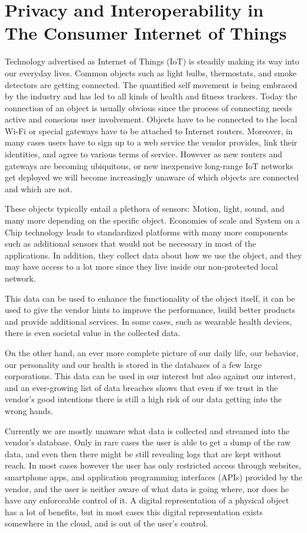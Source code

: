 \chapter{Privacy and Interoperability in The Consumer Internet of Things}


Technology advertised as Internet of Things (IoT) is steadily making its way into our everyday lives. Common objects such as light bulbs, thermostats, and smoke detectors are getting connected. The quantified self movement is being embraced by the industry and has led to all kinds of health and fitness trackers. Today the connection of an object is usually obvious since the process of connecting needs active and conscious user involvement. Objects have to be connected to the local Wi-Fi or special gateways have to be attached to Internet routers. Moreover, in many cases users have to sign up to a web service the vendor provides, link their identities, and agree to various terms of service. However as new routers and gateways are becoming ubiquitous, or new inexpensive long-range IoT networks get deployed we will become increasingly unaware of which objects are connected and which are not. 

These objects typically entail a plethora of sensors: Motion, light, sound, and many more depending on the specific object. Economies of scale and System on a Chip technology leads to standardized platforms with many more components such as additional sensors that would not be necessary in most of the applications. In addition, they collect data about how we use the object, and they may have access to a lot more since they live inside our non-protected local network. 

This data can be used to enhance the functionality of the object itself, it can be used to give the vendor hints to improve the performance, build better products and provide additional services. In some cases, such as wearable health devices, there is even societal value in the collected data. 

On the other hand, an ever more complete picture of our daily life, our behavior, our personality and our health is stored in the databases of a few large corporations. This data can be used in our interest but also against our interest, and an ever-growing list of data breaches shows that even if we trust in the vendor’s good intentions there is still a high risk of our data getting into the wrong hands.

Currently we are mostly unaware what data is collected and streamed into the vendor’s database. Only in rare cases the user is able to get a dump of the raw data, and even then there might be still revealing logs that are kept without reach. In most cases however the user has only restricted access through websites, smartphone apps, and application programming interfaces (APIs) provided by the vendor, and the user is neither aware of what data is going where, nor does he have any enforceable control of it. A digital representation of a physical object has a lot of benefits, but in most cases this digital representation exists somewhere in the cloud, and is out of the user’s control.

